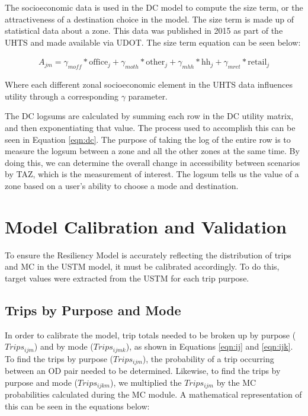 The socioeconomic data is used in the DC model to compute the size term, or
the attractiveness of
a destination choice in the model. The size term is made up of statistical
data about a zone.
This data was published in 2015 as part of the UHTS and made available via
UDOT.  The size term
equation can be seen below:

\begin{equation}
\begin{aligned}
	A_{jm} = \gamma_{m off} * \mathrm{office}_j + \gamma_{m oth} * \mathrm{other}_j + \gamma_{m hh} * \mathrm{hh}_j + \gamma_{m ret} * \mathrm{retail}_j
	\label{eqn:sizeterm}
\end{aligned}
\end{equation}

\noindent Where each different zonal socioeconomic element in the UHTS data influences
utility through a corresponding $\gamma$ parameter.

The DC logsums are calculated by summing each row in the DC utility matrix,
and then
exponentiating that value. The process used to accomplish this can be seen
in Equation \ref{eqn:dc}.
The purpose of taking the log of the entire row is to measure the logsum
between a zone and all
the other zones at the same time. By doing this, we can determine the overall
change in accessibility
between scenarios by TAZ, which is the measurement of interest. The logsum
tells us the value of
a zone based on a user’s ability to choose a mode and destination.

\section{Model Calibration and Validation}

To ensure the Resiliency Model is accurately reflecting the distribution
of trips and MC in the USTM model, it must be
calibrated accordingly. To do this, target values were extracted from the
USTM for each trip purpose.

\subsection{Trips by Purpose and Mode}

In order to calibrate the model, trip totals needed to be broken up by purpose
(\(Trips_{ijm}\)) and by mode (\(Trips_{ijmk}\)), as shown in Equations
\ref{eqn:ij} and \ref{eqn:ijk}. To find the trips by purpose
(\(Trips_{ijm}\)), the probability of a trip occurring between an OD pair needed to
be determined. Likewise, to find the trips by purpose and mode (\(Trips_{ijkm}\)),
we multiplied the \(Trips_{ijm}\) by the MC probabilities calculated during the MC
module. A mathematical representation of this can be seen in the equations
below:

